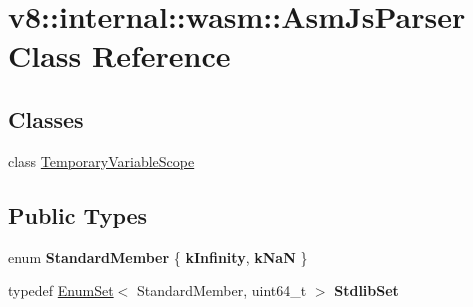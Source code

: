 \hypertarget{classv8_1_1internal_1_1wasm_1_1AsmJsParser}{}\section{v8\+:\+:internal\+:\+:wasm\+:\+:Asm\+Js\+Parser Class Reference}
\label{classv8_1_1internal_1_1wasm_1_1AsmJsParser}
\subsection*{Classes}
\begin{DoxyCompactItemize}
\item 
class \mbox{\hyperlink{classv8_1_1internal_1_1wasm_1_1AsmJsParser_1_1TemporaryVariableScope}{Temporary\+Variable\+Scope}}
\end{DoxyCompactItemize}
\subsection*{Public Types}
\begin{DoxyCompactItemize}
\item 
\mbox{\label{classv8_1_1internal_1_1wasm_1_1AsmJsParser_a0fdde965f695c6b923812c903d2ae82e}} 
enum {\bfseries Standard\+Member} \{ {\bfseries k\+Infinity}, 
{\bfseries k\+NaN}
 \}
\item 
\mbox{\label{classv8_1_1internal_1_1wasm_1_1AsmJsParser_a823c93546dd19fd89c649f1029a11eb2}} 
typedef \mbox{\hyperlink{classv8_1_1internal_1_1EnumSet}{Enum\+Set}}$<$ Standard\+Member, uint64\+\_\+t $>$ {\bfseries Stdlib\+Set}
\end{DoxyCompactItemize}
